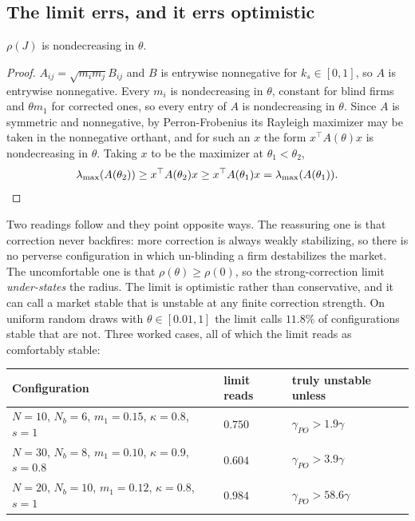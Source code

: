 \subsection{The limit errs, and it errs optimistic}

\begin{aproposition}
\label{aprop:theta}
$\rho(J)$ is nondecreasing in $\theta$.
\end{aproposition}

\begin{proof}
$A_{ij} = \sqrt{m_im_j}B_{ij}$ and $B$ is entrywise nonnegative for $k_s \in [0,1]$, so $A$ is entrywise nonnegative. Every $m_i$ is nondecreasing in $\theta$, constant for blind firms and $\theta m_1$ for corrected ones, so every entry of $A$ is nondecreasing in $\theta$. Since $A$ is symmetric and nonnegative, by Perron-Frobenius its Rayleigh maximizer may be taken in the nonnegative orthant, and for such an $x$ the form $x^{\top}A(\theta)x$ is nondecreasing in $\theta$. Taking $x$ to be the maximizer at $\theta_1 < \theta_2$,
\[
  \lambda_{\max}(A(\theta_2)) \geq x^{\top}A(\theta_2)x \geq x^{\top}A(\theta_1)x = \lambda_{\max}(A(\theta_1)). \qedhere
\]
\end{proof}

Two readings follow and they point opposite ways. The reassuring one is that correction never backfires: more correction is always weakly stabilizing, so there is no perverse configuration in which un-blinding a firm destabilizes the market. The uncomfortable one is that $\rho(\theta) \geq \rho(0)$, so the strong-correction limit \emph{under-states} the radius. The limit is optimistic rather than conservative, and it can call a market stable that is unstable at any finite correction strength. On uniform random draws with $\theta \in [0.01,1]$ the limit calls $11.8\%$ of configurations stable that are not. Three worked cases, all of which the limit reads as comfortably stable:

\begin{center}
\small
\begin{tabular}{lll}
\toprule
Configuration & limit reads & truly unstable unless \\
\midrule
$N=10$, $N_b=6$, $m_1=0.15$, $\kappa=0.8$, $s=1$ & $0.750$ & $\gamma_{PO} > 1.9\gamma$ \\
$N=30$, $N_b=8$, $m_1=0.10$, $\kappa=0.9$, $s=0.8$ & $0.604$ & $\gamma_{PO} > 3.9\gamma$ \\
$N=20$, $N_b=10$, $m_1=0.12$, $\kappa=0.8$, $s=1$ & $0.984$ & $\gamma_{PO} > 58.6\gamma$ \\
\bottomrule
\end{tabular}
\end{center}

